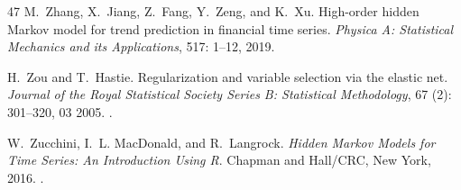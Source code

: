 \documentclass[namedate,webpdf,modern,medium]{oup-authoring-template}
\begin{document}
\begin{thebibliography}{47}
M.~Zhang, X.~Jiang, Z.~Fang, Y.~Zeng, and K.~Xu.
\newblock High-order hidden {M}arkov model for trend prediction in financial
  time series.
\newblock \emph{Physica {A}: {S}tatistical {M}echanics and its {A}pplications},
  517: 1--12, 2019.

H.~Zou and T.~Hastie.
\newblock Regularization and variable selection via the elastic net.
\newblock \emph{Journal of the Royal Statistical Society Series B: Statistical
  Methodology}, 67 (2): 301--320, 03 2005.
\newblock {}.

W.~Zucchini, I.~L. MacDonald, and R.~Langrock.
\newblock \emph{Hidden {M}arkov {M}odels for {T}ime {S}eries: {A}n
  {I}ntroduction {U}sing {R}}.
\newblock Chapman and Hall/CRC, New York, 2016.
\newblock {}.

\end{thebibliography}
\end{document}

